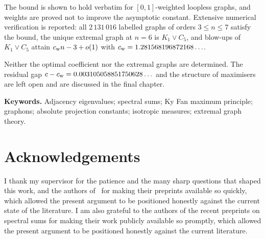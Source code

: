 The bound is shown to hold verbatim for $[0,1]$-weighted loopless graphs, and
weights are proved not to improve the asymptotic constant. Extensive
numerical verification is reported: all $2\,131\,016$ labelled graphs of orders
$3\le n\le7$ satisfy the bound, the unique extremal graph at $n=6$ is
$K_1\vee C_5$, and blow-ups of $K_1\vee C_5$ attain
$c_{\mathrm{w}} n-3+o(1)$ with $c_{\mathrm{w}}=1.281568196872168\ldots$.

Neither the optimal coefficient nor the extremal graphs are determined. The
residual gap $c-c_{\mathrm{w}}=0.003105058851750628\ldots$ and the structure of
maximisers are left open and are discussed in the final chapter.

\vspace{0.4cm}
\noindent\textbf{Keywords.} Adjacency eigenvalues; spectral sums; Ky Fan
maximum principle; graphons; absolute projection constants; isotropic
measures; extremal graph theory.

\chapter*{Acknowledgements}
I thank my supervisor for the patience and the many sharp questions that
shaped this work, and the authors of~\cite{STW,KLMPT,KMMP,Paulin,HW} for
making their preprints available so quickly, which allowed the present
argument to be positioned honestly against the current state of the
literature. I am also grateful to the authors of the recent preprints on spectral sums
for making their work publicly available so promptly, which allowed the
present argument to be positioned honestly against the current literature.

\clearpage
\thispagestyle{empty}
\null
\vfill
